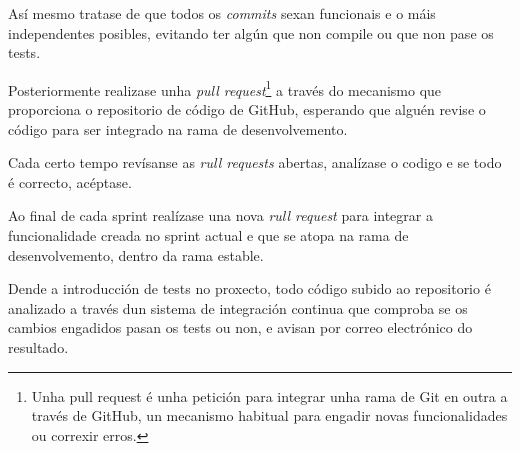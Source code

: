    Así mesmo tratase de que todos os \emph{commits} sexan funcionais e o máis 
independentes posibles, evitando ter algún que non compile ou que non pase 
os tests.

    Posteriormente realizase unha \emph{pull request}\footnote{Unha pull 
request é unha petición para integrar unha rama de Git en outra a través de 
GitHub, un mecanismo habitual para engadir novas funcionalidades ou correxir 
erros.} a través do mecanismo que proporciona o repositorio 
de código de GitHub, esperando que alguén revise o código para ser 
integrado na rama de desenvolvemento.

    Cada certo tempo revísanse as \emph{rull requests} abertas, analízase o 
codigo e se todo é correcto, acéptase.

    Ao final de cada sprint realízase una nova \emph{rull request} para 
integrar a funcionalidade creada no sprint actual e que se atopa na rama de 
desenvolvemento, dentro da rama estable.

    Dende a introducción de tests no proxecto, todo código subido ao 
repositorio é analizado a través dun sistema de integración continua que 
comproba se os cambios engadidos pasan os tests ou non, e avisan por correo 
electrónico do resultado.


